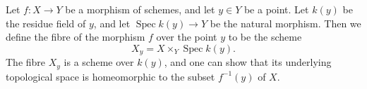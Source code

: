 Let $f: X \rightarrow Y$ be a morphism of schemes, and let $y \in Y$ be a point. Let $k(y)$ be the residue field of $y$, and let $\operatorname{Spec} k(y) \rightarrow Y$ be the natural morphism. Then we define the fibre of the morphism $f$ over the point $y$ to be the scheme
$$X_y = X \times_Y \operatorname{Spec} k(y).$$
The fibre $X_y$ is a scheme over $k(y)$, and one can show that its underlying topological space is homeomorphic to the subset $f^{-1}(y)$ of $X$.
